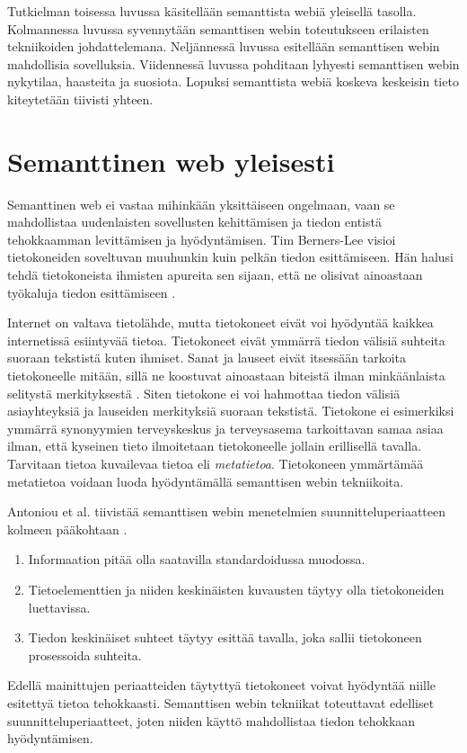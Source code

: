 \documentclass[finnish, 12pt, a4paper, elec, utf8, pdfa, online]{aaltothesis}
\begin{document}
Tutkielman toisessa luvussa käsitellään semanttista webiä yleisellä tasolla. Kolmannessa luvussa syvennytään semanttisen webin toteutukseen erilaisten tekniikoiden johdattelemana. Neljännessä luvussa esitellään semanttisen webin mahdollisia sovelluksia. Viidennessä luvussa pohditaan lyhyesti semanttisen webin nykytilaa, haasteita ja suosiota. Lopuksi semanttista webiä koskeva keskeisin tieto kiteytetään tiivisti yhteen.

\clearpage %
\section{Semanttinen web yleisesti}

Semanttinen web ei vastaa mihinkään yksittäiseen ongelmaan, vaan se mahdollistaa uudenlaisten sovellusten kehittämisen ja tiedon entistä tehokkaamman levittämisen ja hyödyntämisen. Tim Berners-Lee visioi tietokoneiden soveltuvan muuhunkin kuin pelkän tiedon esittämiseen. Hän halusi tehdä tietokoneista ihmisten apureita sen sijaan, että ne olisivat ainoastaan työkaluja tiedon esittämiseen \cite{Berners_visio}.

Internet on valtava tietolähde, mutta tietokoneet eivät voi hyödyntää kaikkea internetissä esiintyvää tietoa. Tietokoneet eivät ymmärrä tiedon välisiä suhteita suoraan tekstistä kuten ihmiset. Sanat ja lauseet eivät itsessään tarkoita tietokoneelle mitään, sillä ne koostuvat ainoastaan biteistä ilman minkäänlaista selitystä merkityksestä \cite{ASCII}. Siten tietokone ei voi hahmottaa tiedon välisiä asiayhteyksiä ja lauseiden merkityksiä suoraan tekstistä. Tietokone ei esimerkiksi ymmärrä synonyymien terveyskeskus ja terveysasema tarkoittavan samaa asiaa ilman, että kyseinen tieto ilmoitetaan tietokoneelle jollain erillisellä tavalla. Tarvitaan tietoa kuvailevaa tietoa eli \textit{metatietoa}. Tietokoneen ymmärtämää metatietoa voidaan luoda hyödyntämällä semanttisen webin tekniikoita.

Antoniou et al. tiivistää semanttisen webin menetelmien suunnitteluperiaatteen kolmeen pääkohtaan \cite{Antoniou}.
\vspace{-0.1cm}
\begin{enumerate}
  \item  Informaation pitää olla saatavilla standardoidussa muodossa.
  \item  Tietoelementtien ja niiden keskinäisten kuvausten täytyy olla tietokoneiden luettavissa.
  \item  Tiedon keskinäiset suhteet täytyy esittää tavalla, joka sallii tietokoneen prosessoida suhteita.
\end{enumerate}
\vspace{-0.1cm}
Edellä mainittujen periaatteiden täytyttyä tietokoneet voivat hyödyntää niille esitettyä tietoa tehokkaasti. Semanttisen webin tekniikat toteuttavat edelliset suunnitteluperiaatteet, joten niiden käyttö mahdollistaa tiedon tehokkaan hyödyntämisen.
\end{document}
